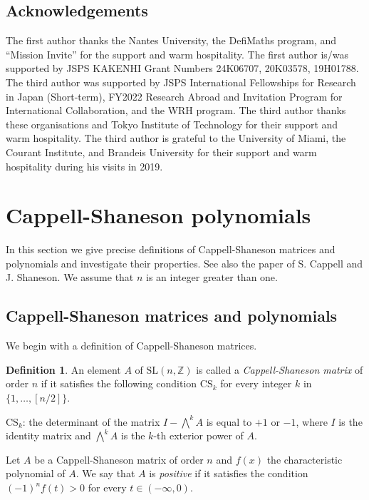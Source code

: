 \documentclass{amsart}
\theoremstyle{plain}
\theoremstyle{definition}
\newtheorem{defn}[thm]{Definition}
\theoremstyle{remark}
\newcommand{\cb}{}
\begin{document}

\subsection*{Acknowledgements}\label{ackref}


The first author thanks the Nantes University, the DefiMaths program, and 
``Mission Invite'' for the support and warm hospitality. 
The first author is/was supported by JSPS KAKENHI Grant Numbers 
24K06707, 20K03578, 19H01788. 
The third author was supported by JSPS International Fellowships for Research in Japan 
(Short-term), FY2022 Research Abroad and Invitation Program for International Collaboration, 
and the WRH program. 
{\cb The third author thanks these organisations and Tokyo Institute of Technology
for their support and warm hospitality. The third author is grateful to the University of Miami,
the Courant Institute, and Brandeis University for their support and warm hospitality
during his visits in 2019.}



\section{Cappell-Shaneson polynomials}


In this section we give precise definitions of Cappell-Shaneson matrices and polynomials 
and investigate {\cb their properties}.
See also the paper \cite{CS1976} of S. Cappell and J. Shaneson.
We assume that $n$ is an integer greater than one. 

\subsection{Cappell-Shaneson matrices and polynomials}

We begin with a {\cb  definition } of Cappell-Shaneson matrices.

\begin{defn}\label{CSm}
An element $A$ of $\mathrm{SL}(n,\mathbb{Z})$ is called 
a {\it Cappell-Shaneson matrix} of order $n$ if it satisfies the following condition 
$\mathrm{CS}_k$ for every integer $k$ in $\{1,\ldots ,[n/2]\}$. 

$\mathrm{CS}_k$: the determinant of the matrix $I-\bigwedge^kA$ is equal to $+1$ or $-1$, 
where $I$ is the identity matrix and $\bigwedge^kA$ is the $k$-th exterior power of $A$. 

Let $A$ be a Cappell-Shaneson matrix of order $n$ and $f(x)$ the characteristic polynomial of $A$. 
We say that $A$ is {\it positive} if it satisfies the condition $(-1)^nf(t)>0$ for every $t\in (-\infty,0)$. 
\end{defn}
\end{document}
